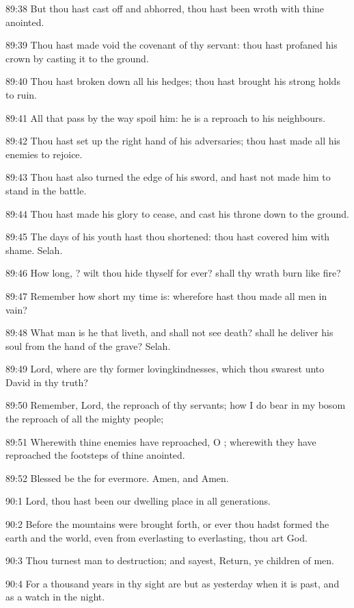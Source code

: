 89:38 But thou hast cast off and abhorred, thou hast been wroth with
thine anointed.

89:39 Thou hast made void the covenant of thy servant: thou hast
profaned his crown by casting it to the ground.

89:40 Thou hast broken down all his hedges; thou hast brought his
strong holds to ruin.

89:41 All that pass by the way spoil him: he is a reproach to his
neighbours.

89:42 Thou hast set up the right hand of his adversaries; thou hast
made all his enemies to rejoice.

89:43 Thou hast also turned the edge of his sword, and hast not made
him to stand in the battle.

89:44 Thou hast made his glory to cease, and cast his throne down to
the ground.

89:45 The days of his youth hast thou shortened: thou hast covered him
with shame. Selah.

89:46 How long, \LORD? wilt thou hide thyself for ever? shall thy wrath
burn like fire?

89:47 Remember how short my time is: wherefore hast thou made all men
in vain?

89:48 What man is he that liveth, and shall not see death? shall he
deliver his soul from the hand of the grave? Selah.

89:49 Lord, where are thy former lovingkindnesses, which thou swarest
unto David in thy truth?

89:50 Remember, Lord, the reproach of thy servants; how I do bear in
my bosom the reproach of all the mighty people;

89:51 Wherewith thine enemies have reproached, O \LORD; wherewith they
have reproached the footsteps of thine anointed.

89:52 Blessed be the \LORD for evermore. Amen, and Amen.



90:1 Lord, thou hast been our dwelling place in all generations.

90:2 Before the mountains were brought forth, or ever thou hadst
formed the earth and the world, even from everlasting to everlasting,
thou art God.

90:3 Thou turnest man to destruction; and sayest, Return, ye children
of men.

90:4 For a thousand years in thy sight are but as yesterday when it is
past, and as a watch in the night.

